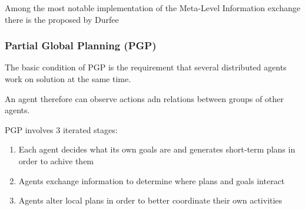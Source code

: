Among the most notable implementation of the Meta-Level Information exchange there is the  proposed by Durfee
\subsubsection{Partial Global Planning (PGP)}
The basic condition of PGP is the requirement that several distributed agents work on solution at the same time.

An agent therefore can observe actions adn relations between groups of other agents.
\missingfigure{}

PGP involves 3 iterated stages:
\begin{enumerate}
\item Each agent decides what its own goals are and generates short-term plans in order to achive them
\item Agents exchange information to determine where plans and goals interact
\item Agents alter local plans in order to better coordinate their own activities
\end{enumerate}

